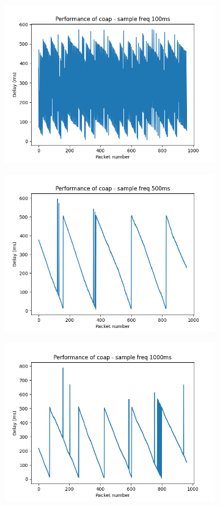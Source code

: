 \documentclass[]{article}
\begin{document}
\begin{figure}[h]
	\begin{subfigure}{0.5\textwidth}
		\includegraphics[width=0.9 \linewidth]{../performance_eval/protocols/fig/coap_100ms}
		\caption{}
		\label{fig:coap100ms}
	\end{subfigure}
	\begin{subfigure}{0.5\textwidth}
		\includegraphics[width=0.9\linewidth]{../performance_eval/protocols/fig/coap_500ms}
		\caption{}
		\label{fig:coap500ms}
	\end{subfigure}	
	\begin{subfigure}{0.5\textwidth}
		\includegraphics[width=0.9\linewidth]{../performance_eval/protocols/fig/coap_1000ms}

\end{subfigure}
\end{figure}
\end{document}
